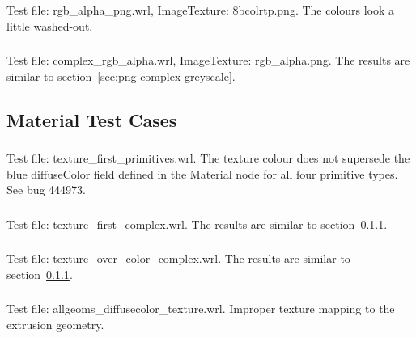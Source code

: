 \subsubsection{\ITWa\ITWb}
Test file: rgb\_alpha\_png.wrl, ImageTexture: 8bcolrtp.png.\newline
The colours look a little washed-out.

\subsubsection{\ITXa\ITXb}
Test file: complex\_rgb\_alpha.wrl, ImageTexture: rgb\_alpha.png.\newline
The results are similar to section~\ref{sec:png-complex-greyscale}.

\subsection{Material Test Cases}

\setcounter{subsubsection}{7}
\subsubsection{\MatGa\MatGb}
\label{sec:pref-colour}
Test file: texture\_first\_primitives.wrl.\newline
The texture colour does not supersede the blue diffuseColor field defined
in the Material node for all four primitive types.
See bug 444973.

\subsubsection{\MatHa\MatHb}
Test file: texture\_first\_complex.wrl.\newline
The results are similar to section~\ref{sec:pref-colour}.

\subsubsection{\MatIa\MatIb}
Test file: texture\_over\_color\_complex.wrl.\newline
The results are similar to section~\ref{sec:pref-colour}.

\subsubsection{\MatJa\MatJb}
Test file: allgeoms\_diffusecolor\_texture.wrl.\newline
Improper texture mapping to the extrusion geometry.

